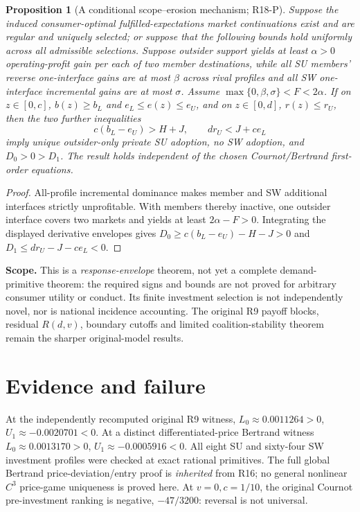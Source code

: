 \documentclass[11pt]{article}
\newtheorem{proposition}{Proposition}
\begin{document}
\begin{proposition}[A conditional scope--erosion mechanism; R18-P]
Suppose the induced consumer-optimal fulfilled-expectations market
continuations exist and are regular and uniquely selected; or suppose
that the following bounds hold uniformly across all admissible selections.
Suppose outsider support yields at least \(\alpha>0\) operating-profit
gain per each of two member destinations, while all SU members' reverse
one-interface gains are at most \(\beta\) across rival profiles
and all SW one-interface incremental gains are at most \(\sigma\).
Assume \(\max\{0,\beta,\sigma\}<F<2\alpha\).
If on \(z\in[0,c]\), \(b(z)\ge b_L\) and
\(e_L\le e(z)\le e_U\), and on \(z\in[0,d]\),
\(r(z)\le r_U\), then the two further inequalities
\[
c(b_L-e_U)>H+J,\qquad d r_U<J+c e_L
\]
imply unique outsider-only private SU adoption, no SW adoption,
and \(D_0>0>D_1\). The result holds independent of
the chosen Cournot/Bertrand first-order equations.
\end{proposition}
\begin{proof}
All-profile incremental dominance makes member and SW additional
interfaces strictly unprofitable. With members thereby inactive, one
outsider interface covers two markets and yields at least \(2\alpha-F>0\).
Integrating the displayed derivative envelopes gives
\(D_0\ge c(b_L-e_U)-H-J>0\)
and \(D_1\le dr_U-J-ce_L<0\).
\end{proof}

\noindent\textbf{Scope.} This is a \emph{response-envelope} theorem, not
yet a complete demand-primitive theorem: the required signs and bounds
are not proved for arbitrary consumer utility or conduct. Its finite
investment selection is not independently novel, nor is national
incidence accounting. The original R9 payoff blocks, residual
\(R(d,v)\), boundary cutoffs and limited coalition-stability theorem
remain the sharper original-model results.

\section{Evidence and failure}
At the independently recomputed original R9 witness,
\(L_0\approx0.0011264>0\), \(U_1\approx-0.0020701<0\).
At a distinct differentiated-price Bertrand witness
\(L_0\approx0.0013170>0\),
\(U_1\approx-0.0005916<0\). All eight SU and
sixty-four SW investment profiles were checked at exact rational
primitives. The full global Bertrand price-deviation/entry proof is
\emph{inherited} from R16; no general nonlinear \(C^3\) price-game
uniqueness is proved here. At \(v=0,c=1/10\), the original Cournot
pre-investment ranking is negative, \(-47/3200\):
reversal is not universal.
\end{document}
